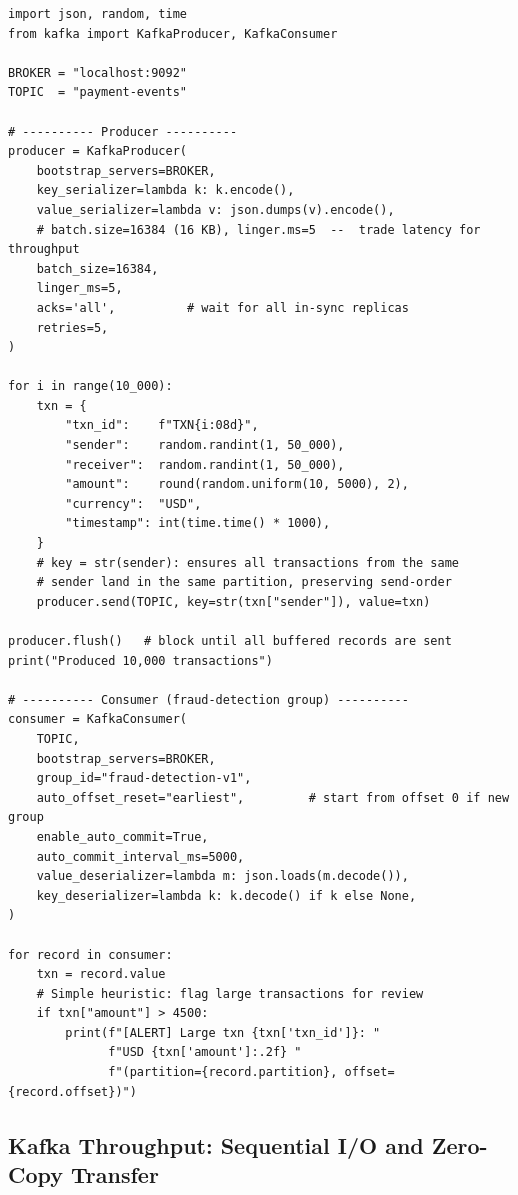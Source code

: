\begin{lstlisting}[style=pyspark, caption={Kafka producer and consumer in Python (kafka-python)}]
import json, random, time
from kafka import KafkaProducer, KafkaConsumer

BROKER = "localhost:9092"
TOPIC  = "payment-events"

# ---------- Producer ----------
producer = KafkaProducer(
    bootstrap_servers=BROKER,
    key_serializer=lambda k: k.encode(),
    value_serializer=lambda v: json.dumps(v).encode(),
    # batch.size=16384 (16 KB), linger.ms=5  --  trade latency for throughput
    batch_size=16384,
    linger_ms=5,
    acks='all',          # wait for all in-sync replicas
    retries=5,
)

for i in range(10_000):
    txn = {
        "txn_id":    f"TXN{i:08d}",
        "sender":    random.randint(1, 50_000),
        "receiver":  random.randint(1, 50_000),
        "amount":    round(random.uniform(10, 5000), 2),
        "currency":  "USD",
        "timestamp": int(time.time() * 1000),
    }
    # key = str(sender): ensures all transactions from the same
    # sender land in the same partition, preserving send-order
    producer.send(TOPIC, key=str(txn["sender"]), value=txn)

producer.flush()   # block until all buffered records are sent
print("Produced 10,000 transactions")

# ---------- Consumer (fraud-detection group) ----------
consumer = KafkaConsumer(
    TOPIC,
    bootstrap_servers=BROKER,
    group_id="fraud-detection-v1",
    auto_offset_reset="earliest",         # start from offset 0 if new group
    enable_auto_commit=True,
    auto_commit_interval_ms=5000,
    value_deserializer=lambda m: json.loads(m.decode()),
    key_deserializer=lambda k: k.decode() if k else None,
)

for record in consumer:
    txn = record.value
    # Simple heuristic: flag large transactions for review
    if txn["amount"] > 4500:
        print(f"[ALERT] Large txn {txn['txn_id']}: "
              f"USD {txn['amount']:.2f} "
              f"(partition={record.partition}, offset={record.offset})")
\end{lstlisting}

\subsection{Kafka Throughput: Sequential I/O and Zero-Copy Transfer}
\label{subsec:kafka-throughput}

